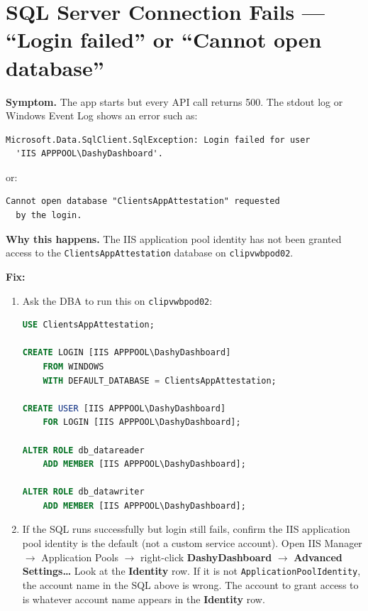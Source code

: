 \documentclass[a4paper,11pt]{article}
\begin{document}
\section{SQL Server Connection Fails --- ``Login failed'' or ``Cannot open database''}
\label{sec:sqlconnfail}

\textbf{Symptom.}
The app starts but every API call returns 500.
The stdout log or Windows Event Log shows an error such as:

\begin{lstlisting}
Microsoft.Data.SqlClient.SqlException: Login failed for user
  'IIS APPPOOL\DashyDashboard'.
\end{lstlisting}
or:
\begin{lstlisting}
Cannot open database "ClientsAppAttestation" requested
  by the login.
\end{lstlisting}

\textbf{Why this happens.}
The IIS application pool identity has not been granted access to the
\texttt{ClientsAppAttestation} database on \texttt{clipvwbpod02}.

\textbf{Fix:}

\begin{enumerate}
  \item Ask the DBA to run this on \texttt{clipvwbpod02}:
\begin{lstlisting}[language=SQL]
USE ClientsAppAttestation;

CREATE LOGIN [IIS APPPOOL\DashyDashboard]
    FROM WINDOWS
    WITH DEFAULT_DATABASE = ClientsAppAttestation;

CREATE USER [IIS APPPOOL\DashyDashboard]
    FOR LOGIN [IIS APPPOOL\DashyDashboard];

ALTER ROLE db_datareader
    ADD MEMBER [IIS APPPOOL\DashyDashboard];

ALTER ROLE db_datawriter
    ADD MEMBER [IIS APPPOOL\DashyDashboard];
\end{lstlisting}
  \item If the SQL runs successfully but login still fails,
        confirm the IIS application pool identity is the default
        (not a custom service account).
        Open IIS Manager $\rightarrow$ Application Pools $\rightarrow$ right-click
        \textbf{DashyDashboard} $\rightarrow$ \textbf{Advanced Settings\ldots}
        Look at the \textbf{Identity} row.
        If it is not \texttt{ApplicationPoolIdentity}, the account name in the SQL
        above is wrong.
        The account to grant access to is whatever account name appears in the
        \textbf{Identity} row.
\end{enumerate}
\end{document}
